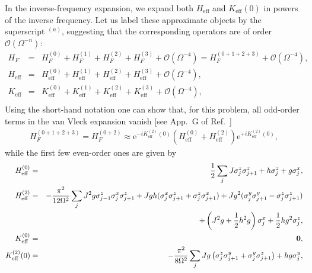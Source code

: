 \documentclass{SciPost}
\newcommand\0{\scalebox{-1}[1]{0}}
\begin{document}
In the inverse-frequency expansion, we expand both $H_\mathrm{eff}$ and $K_\mathrm{eff}(0)$ in powers of the inverse frequency. Let us label these approximate objects by the superscript $^{(n)}$, suggesting that the corresponding operators are of order $\mathcal{O}(\Omega^{-n})$:
\begin{eqnarray*}
H_F &=& H_F^{(0)} + H_F^{(1)} + H_F^{(2)} + H_F^{(3)} + \mathcal{O}(\Omega^{-4}) = H_F^{(0+1+2+3)} + \mathcal{O}(\Omega^{-4}), \nonumber\\ 
H_\mathrm{eff} &=& H_\mathrm{eff}^{(0)} + H_\mathrm{eff}^{(1)} + H_\mathrm{eff}^{(2)} + H_\mathrm{eff}^{(3)} + \mathcal{O}(\Omega^{-4}), \nonumber\\ 
K_\mathrm{eff} &=& K_\mathrm{eff}^{(0)} + K_\mathrm{eff}^{(1)} + K_\mathrm{eff}^{(2)} + K_\mathrm{eff}^{(3)} + \mathcal{O}(\Omega^{-4}), \nonumber\\ 
\end{eqnarray*}
Using the short-hand notation one can show that, for this problem, all odd-order terms in the van Vleck expansion vanish [see App.~G of Ref.~\cite{floquet_thesis}]
\begin{eqnarray}
H_F^{(0+1+2+3)} = H_F^{(0+2)}\approx \mathrm e^{-iK_\mathrm{eff}^{(2)}(0)}\left( H_\mathrm{eff}^{(0)} + H_\mathrm{eff}^{(2)} \right)\mathrm e^{+iK_\mathrm{eff}^{(2)}(0)}, 
\end{eqnarray}
while the first few even-order ones are given by
\begin{eqnarray}
\label{eq:vV_corrs}
H_\mathrm{eff}^{(0)} &=& \frac{1}{2}\sum_j J\sigma^z_j\sigma^z_{j+1} + h\sigma^z_j + g\sigma^x_j,\nonumber\\
H_\mathrm{eff}^{(2)} &=& -\frac{\pi^2}{12\Omega^2}\sum_j J^2g\sigma^z_{j-1}\sigma^x_j\sigma^z_{j+1} + Jgh(\sigma^x_j\sigma^z_{j+1} + \sigma^z_j\sigma^x_{j+1}) + Jg^2(\sigma^y_j\sigma^y_{j+1}-\sigma^z_j\sigma^z_{j+1}) \nonumber\\
&& \quad \qquad\qquad + \left(J^2g + \frac{1}{2}h^2g\right)\sigma^x_j + \frac{1}{2}hg^2\sigma^z_j,\nonumber\\
K_\mathrm{eff}^{(0)} &=& {\bf 0},\nonumber\\
K_\mathrm{eff}^{(2)}(0) &=& -\frac{\pi^2}{8\Omega^2}\sum_j Jg\left(\sigma^z_j\sigma^y_{j+1} + \sigma^y_j\sigma^z_{j+1}\right) +hg\sigma^y_j,
\end{eqnarray}
\end{document}
